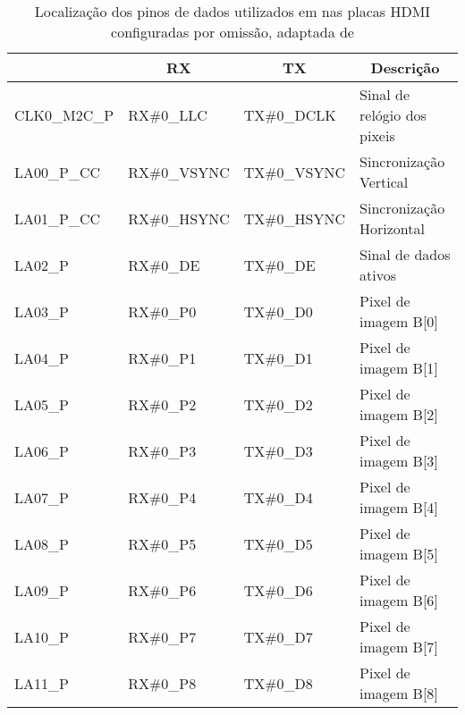 \begin{longtable}[h!]
	{@{}llll@{}}
		\caption[Localização dos pinos de dados utilizados em nas placas HDMI configuradas por omissão]{Localização dos pinos de dados utilizados em nas placas HDMI configuradas por omissão, adaptada de \cite{R009}}
		\label{table:HDMIdataDefaultdetail}
		\hline
		\centering	
		\multicolumn{1}{c}{\textbf{PORTA}} & \multicolumn{1}{c}{\textbf{RX}} & \multicolumn{1}{c}{\textbf{TX}} & \multicolumn{1}{c}{\textbf{Descrição}} \\ \hline \endhead
		CLK0\_M2C\_P & RX\#0\_LLC                           & TX\#0\_DCLK                        & Sinal de relógio dos pixeis         \\ 
		LA00\_P\_CC  & RX\#0\_VSYNC                         & TX\#0\_VSYNC                       & Sincronização Vertical          \\ 
		LA01\_P\_CC  & RX\#0\_HSYNC                         & TX\#0\_HSYNC                       & Sincronização Horizontal        \\ 
		LA02\_P      & RX\#0\_DE                            & TX\#0\_DE                          & Sinal de dados ativos    \\ 
		LA03\_P      & RX\#0\_P0                            & TX\#0\_D0                          & Pixel de imagem B{[}0{]} \\ 
		LA04\_P      & RX\#0\_P1                            & TX\#0\_D1                          & Pixel de imagem B{[}1{]} \\ 
		LA05\_P      & RX\#0\_P2                            & TX\#0\_D2                          & Pixel de imagem B{[}2{]} \\ 
		LA06\_P      & RX\#0\_P3                            & TX\#0\_D3                          & Pixel de imagem B{[}3{]} \\ 
		LA07\_P      & RX\#0\_P4                            & TX\#0\_D4                          & Pixel de imagem B{[}4{]} \\ 
		LA08\_P      & RX\#0\_P5                            & TX\#0\_D5                          & Pixel de imagem B{[}5{]} \\ 
		LA09\_P      & RX\#0\_P6                            & TX\#0\_D6                          & Pixel de imagem B{[}6{]} \\ 
		LA10\_P      & RX\#0\_P7                            & TX\#0\_D7                          & Pixel de imagem B{[}7{]} \\ 
		LA11\_P      & RX\#0\_P8                            & TX\#0\_D8                          & Pixel de imagem B{[}8{]} \\ 

\end{longtable}
